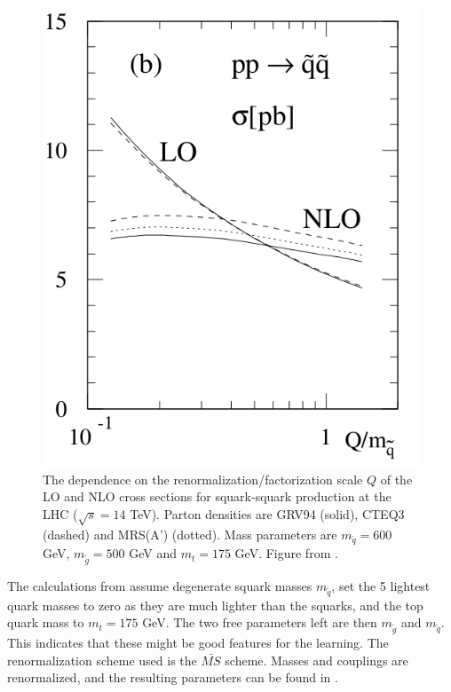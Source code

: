 \documentclass[twoside,english]{uiofysmaster}
\begin{document}
\begin{figure}
\centering
\includegraphics[scale=0.4]{squark_gluino_LO_NLO.png}
\caption{The dependence on the renormalization/factorization scale $Q$ of the LO and NLO cross sections for squark-squark production at the LHC ($\sqrt{s}=14$ TeV). Parton densities are GRV94 (solid), CTEQ3 (dashed) and MRS(A') (dotted). Mass parameters are $m_{\tilde{q}}=600$ GeV, $m_{\tilde{g}}=500$ GeV and $m_t=175$ GeV. Figure from \cite{beenakker1997squark}.}
\label{Fig:: hadron susy : LO vs NLO beenakker}
\end{figure}


The calculations from \cite{beenakker1997squark} assume degenerate squark masses $m_{\tilde{q}}$, set the 5 lightest quark masses to zero as they are much lighter than the squarks, and the top quark mass to $m_t =175$ GeV. The two free parameters left are then $m_{\tilde{g}}$ and $m_{\tilde{q}}$. This indicates that these might be good features for the learning. The renormalization scheme used is the $\bar{MS}$ scheme. Masses and couplings are renormalized, and the resulting parameters can be found in \cite{beenakker1997squark}.
\end{document}

